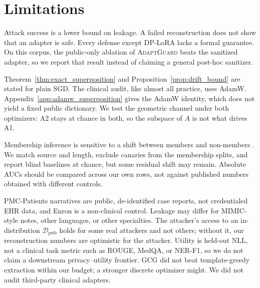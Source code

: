\documentclass[11pt]{article}
\newcommand{\D}{\mathcal{D}}
\theoremstyle{plain}
\theoremstyle{definition}
\begin{document}
\section*{Limitations}

Attack success is a lower bound on leakage. A failed reconstruction does not show that an adapter is safe.
Every defense except DP-LoRA lacks a formal guarantee.
On this corpus, the public-only ablation of \textsc{AdaptGuard} beats the sanitized adapter, so we report that result instead of claiming a general post-hoc sanitizer.

Theorem~\ref{thm:exact_superposition} and Proposition~\ref{prop:drift_bound} are stated for plain SGD. The clinical audit, like almost all practice, uses AdamW.
Appendix~\ref{app:adamw_superposition} gives the AdamW identity, which does not yield a fixed public dictionary.
We test the geometric channel under both optimizers: A2 stays at chance in both, so the subspace of $A$ is not what drives A1.

Membership inference is sensitive to a shift between members and non-members \citep{duan2024mia}.
We match source and length, exclude canaries from the membership splits, and report blind baselines at chance, but some residual shift may remain.
Absolute AUCs should be compared across our own rows, not against published numbers obtained with different controls.

PMC-Patients narratives are public, de-identified case reports, not credentialed EHR data, and Enron is a non-clinical control.
Leakage may differ for MIMIC-style notes, other languages, or other specialties.
The attacker's access to an in-distribution $\D_{\text{pub}}$ holds for some real attackers and not others; without it, our reconstruction numbers are optimistic for the attacker.
Utility is held-out NLL, not a clinical task metric such as ROUGE, MedQA, or NER-F1, so we do not claim a downstream privacy--utility frontier.
GCG did not beat template-greedy extraction within our budget; a stronger discrete optimizer might.
We did not audit third-party clinical adapters.


\end{document}
